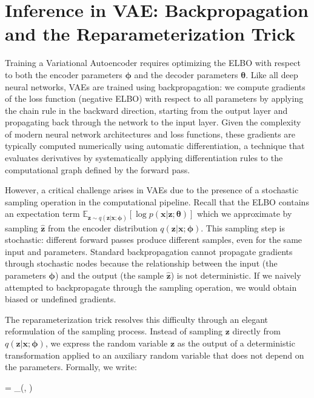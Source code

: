 \section*{Inference in VAE: Backpropagation and the Reparameterization Trick}

Training a Variational Autoencoder requires optimizing the ELBO with respect to both the encoder parameters $\boldsymbol{\phi}$ and the decoder parameters $\boldsymbol{\theta}$. Like all deep neural networks, VAEs are trained using backpropagation: we compute gradients of the loss function (negative ELBO) with respect to all parameters by applying the chain rule in the backward direction, starting from the output layer and propagating back through the network to the input layer. Given the complexity of modern neural network architectures and loss functions, these gradients are typically computed numerically using automatic differentiation, a technique that evaluates derivatives by systematically applying differentiation rules to the computational graph defined by the forward pass.

However, a critical challenge arises in VAEs due to the presence of a stochastic sampling operation in the computational pipeline. Recall that the ELBO contains an expectation term $\mathbb{E}_{\mathbf{z} \sim q(\mathbf{z}|\mathbf{x}; \boldsymbol{\phi})} [\log p(\mathbf{x}|\mathbf{z}; \boldsymbol{\theta})]$ which we approximate by sampling $\hat{\mathbf{z}}$ from the encoder distribution $q(\mathbf{z}|\mathbf{x}; \boldsymbol{\phi})$. This sampling step is stochastic: different forward passes produce different samples, even for the same input and parameters. Standard backpropagation cannot propagate gradients through stochastic nodes because the relationship between the input (the parameters $\boldsymbol{\phi}$) and the output (the sample $\hat{\mathbf{z}}$) is not deterministic. If we naively attempted to backpropagate through the sampling operation, we would obtain biased or undefined gradients.

The reparameterization trick resolves this difficulty through an elegant reformulation of the sampling process. Instead of sampling $\mathbf{z}$ directly from $q(\mathbf{z}|\mathbf{x}; \boldsymbol{\phi})$, we express the random variable $\mathbf{z}$ as the output of a deterministic transformation applied to an auxiliary random variable that does not depend on the parameters. Formally, we write:
\begin{myequation}
 = _{\boldsymbol{\phi}}(, \boldsymbol{\varepsilon})
\end{myequation}

